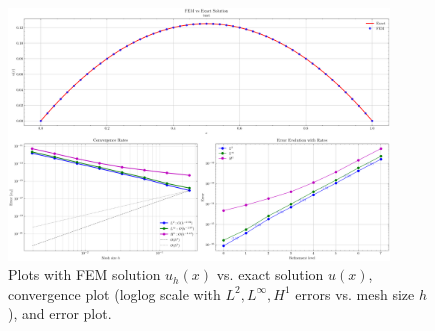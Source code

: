 \documentclass[a4paper,10pt]{article}
\begin{document}
\begin{figure}[H]
	\centering
	\includegraphics[width=0.9\textwidth]{figures/convergence_ex1.png}
	\caption{Plots with FEM solution \(u_h(x)\) vs. exact solution \(u(x)\), convergence plot (loglog scale with $L^2, L^\infty, H^1$ errors vs. mesh size $h$), and error plot.}
	\label{fig:solution_smooth}
\end{figure}
\end{document}
